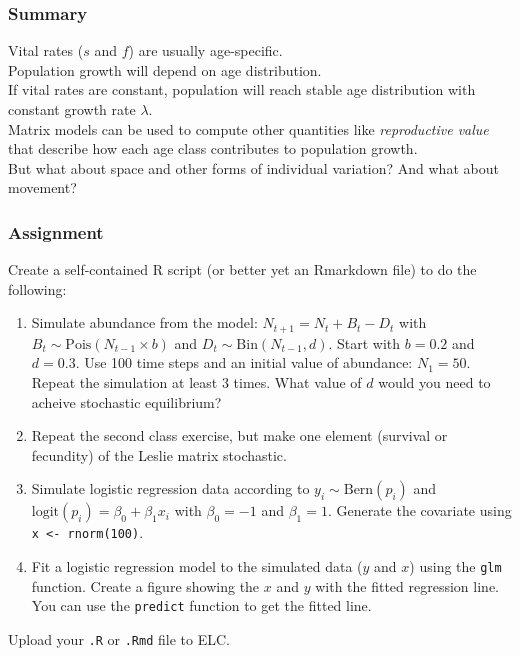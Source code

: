 \documentclass[color=usenames,dvipsnames]{beamer}\usepackage[]{graphicx}\usepackage[]{color}
\newcommand{\inr}[1]{\colorbox{inlinecolor}{\texttt{#1}}}
\begin{document}











\begin{frame}
  \frametitle{Summary}
  Vital rates ($s$ and $f$) are usually age-specific. \\
  \pause
  \vfill
  Population growth will depend on age distribution. \\
  \pause
  \vfill
  If vital rates are constant, population will reach stable
  age distribution with constant growth rate $\lambda$. \\
  \pause
  \vfill
  Matrix models can be used to compute other quantities like
  \emph{reproductive value} that describe how each age class
  contributes to population growth. \\
  \pause
  \vfill
  But what about space and other forms of individual variation? And
  what about movement?
\end{frame}



    

\begin{frame}
  \frametitle{Assignment}
  \small
  Create a self-contained R script (or better yet an Rmarkdown file)
  to do the following:
  \begin{enumerate}
    \footnotesize
    \item Simulate abundance from the model: $N_{t+1} = N_{t} + B_{t}
      - D_{t}$ with $B_{t} \sim \mathrm{Pois}(N_{t-1} \times b)$ and
      $D_t \sim \mathrm{Bin}(N_{t-1}, d)$. Start with $b=0.2$ and
      $d=0.3$. Use 100 time steps and an initial value of abundance:
      $N_1=50$. Repeat the simulation at least 3 times. What value of
      $d$ would you need to acheive stochastic equilibrium?
    \item Repeat the second class exercise, but make one element
      (survival or fecundity) of the Leslie matrix stochastic.
    \item Simulate logistic regression data according to
      $y_i \sim \mathrm{Bern}(p_i)$ and $\mathrm{logit}(p_i) = \beta_0
      + \beta_1 x_i$ with $\beta_0=-1$ and $\beta_1=1$. Generate the
      covariate using \inr{x <- rnorm(100)}.
    \item Fit a logistic regression model to the simulated data ($y$
      and $x$) using the \inr{glm} function. Create a figure showing
      the $x$ and $y$ with the fitted regression line. You can use the
      \inr{predict} function to get the fitted line.
  \end{enumerate}
  Upload your {\tt .R} or {\tt .Rmd} file to ELC.  
\end{frame}
\end{document}
